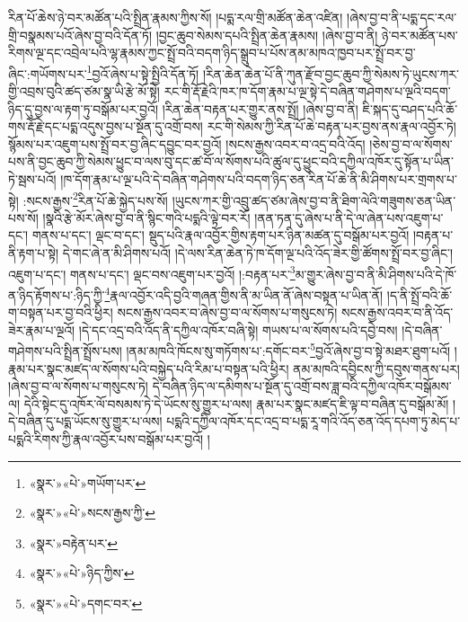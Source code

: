 རིན་པོ་ཆེས་ཉེ་བར་མཚོན་པའི་སྤྲིན་རྣམས་ཀྱིས་སོ། །པདྨ་རལ་གྲི་མཚོན་ཆེན་འཛིན། །ཞེས་བྱ་བ་ནི་པདྨ་དང་རལ་གྲི་བསྣམས་པའོ་ཞེས་བྱ་བའི་དོན་ཏོ། །བྱང་ཆུབ་སེམས་དཔའི་སྤྲིན་ཆེན་རྣམས། །ཞེས་བྱ་བ་ནི། ཉེ་བར་མཚོན་པས་རིགས་ལྔ་དང་འབྲེལ་པའི་ལྷ་རྣམས་ཀྱང་སྤྲོ་བའི་བདག་ཉིད་སྒྲུབ་པ་པོས་ནམ་མཁའ་ཁྱབ་པར་སྤྲོ་བར་བྱ་ཞིང་:གཡོགས་པར་\footnote{«སྣར་»«པེ་»གཡོག་པར་}བྱའོ་ཞེས་པ་སྟེ་སྤྱིའི་དོན་ཏོ། །རིན་ཆེན་ཆེན་པོ་ནི་ཀུན་རྫོབ་བྱང་ཆུབ་ཀྱི་སེམས་ཏེ་ཡུངས་ཀར་གྱི་འབྲས་བུའི་ཚད་ཙམ་སྣ་ཡི་རྩེ་མོ་སྟེ། རང་གི་རྡོ་རྗེའི་ཁར་ཁ་དོག་རྣམ་པ་ལྔ་སྟེ་དེ་བཞིན་གཤེགས་པ་ལྔའི་བདག་ཉིད་དུ་བྱས་ལ་རྟག་ཏུ་བསྒོམ་པར་བྱའོ། །རིན་ཆེན་བརྟན་པར་གྱུར་ནས་སྤྲོ། །ཞེས་བྱ་བ་ནི། ཇི་སྐད་དུ་བཤད་པའི་ཆོ་གས་རྡོ་རྗེ་དང་པདྨ་འདུས་བྱས་པ་སྔོན་དུ་འགྲོ་བས། རང་གི་སེམས་ཀྱི་རིན་པོ་ཆེ་བརྟན་པར་བྱས་ནས་རྣལ་འབྱོར་ཏེ། སྙོམས་པར་འཇུག་པས་སྤྲོ་བར་བྱ་ཞིང་དབྱུང་བར་བྱའོ། །སངས་རྒྱས་འབར་བ་འདྲ་བའི་འོད། །ཅེས་བྱ་བ་ལ་སོགས་པས་ནི་བྱང་ཆུབ་ཀྱི་སེམས་ཕྱུང་བ་ལས་བུ་དང་ཚ་བོ་ལ་སོགས་པའི་ཚུལ་དུ་ཕྱུང་བའི་དཀྱིལ་འཁོར་དུ་སྟོན་པ་ཡིན་ཏེ་སྦས་པའོ། །ཁ་དོག་རྣམ་པ་ལྔ་པའི་དེ་བཞིན་གཤེགས་པའི་བདག་ཉིད་ཅན་རིན་པོ་ཆེ་ནི་མི་ཤིགས་པར་གྲགས་པ་སྟེ། :སངས་རྒྱས་\footnote{«སྣར་»«པེ་»སངས་རྒྱས་ཀྱི་}རིན་པོ་ཆེ་སྐྱེད་པས་སོ། །ཡུངས་ཀར་གྱི་འབྲུ་ཚད་ཙམ་ཞེས་བྱ་བ་ནི་ཐིག་ལེའི་གཟུགས་ཅན་ཡིན་པས་སོ། །སྣའི་རྩེ་མོར་ཞེས་བྱ་བ་ནི་སྙིང་གའི་པདྨའི་ལྟེ་བར་རོ། །ནན་ཏན་དུ་ཞེས་པ་ནི་དེ་ལ་ཞེན་པས་འཇུག་པ་དང་། གནས་པ་དང་། ལྡང་བ་དང་། སྡུད་པའི་རྣལ་འབྱོར་གྱིས་རྟག་པར་ཉིན་མཚན་དུ་བསྒོམ་པར་བྱའོ། །བརྟན་པ་ནི་རྟག་པ་སྟེ། དེ་གང་ཞེ་ན་མི་ཤིགས་པའོ། །དེ་ལས་རིན་ཆེན་ཏེ་ཁ་དོག་ལྔ་པའི་འོད་ཟེར་གྱི་ཚོགས་སྤྲོ་བར་བྱ་ཞིང་། འཇུག་པ་དང་། གནས་པ་དང་། ལྡང་བས་འཇུག་པར་བྱའོ། །:བརྟན་པར་\footnote{«སྣར་»བརྟེན་པར་}མ་གྱུར་ཞེས་བྱ་བ་ནི་མི་ཤིགས་པའི་དེ་ཁོ་ན་ཉིད་རྟོགས་པ་:ཉིད་ཀྱི་\footnote{«སྣར་»«པེ་»ཉིད་ཀྱིས་}རྣལ་འབྱོར་འདི་བྱའི་གཞན་གྱིས་ནི་མ་ཡིན་ནོ་ཞེས་བསྟན་པ་ཡིན་ནོ། །ད་ནི་སྤྲོ་བའི་ཆོ་ག་བསྟན་པར་བྱ་བའི་ཕྱིར། སངས་རྒྱས་འབར་བ་ཞེས་བྱ་བ་ལ་སོགས་པ་གསུངས་ཏེ། སངས་རྒྱས་འབར་བ་ནི་འོད་ཟེར་རྣམ་པ་ལྔའོ། །དེ་དང་འདྲ་བའི་འོད་ནི་དཀྱིལ་འཁོར་བཞི་སྟེ། གཡས་པ་ལ་སོགས་པའི་དབྱེ་བས། །དེ་བཞིན་གཤེགས་པའི་སྤྲིན་སྤྲོས་པས། །ནམ་མཁའི་ཁོངས་སུ་གཏོགས་པ་:དགོང་བར་\footnote{«སྣར་»«པེ་»དགང་བར་}བྱའོ་ཞེས་བྱ་བ་སྟེ་མཐར་ཐུག་པའོ། །རྣམ་པར་སྣང་མཛད་ལ་སོགས་པའི་བསྐྱེད་པའི་རིམ་པ་བསྟན་པའི་ཕྱིར། ནམ་མཁའི་དབྱིངས་ཀྱི་དབུས་གནས་པར། །ཞེས་བྱ་བ་ལ་སོགས་པ་གསུངས་ཏེ། དེ་བཞིན་ཉིད་ལ་དམིགས་པ་སྔོན་དུ་འགྲོ་བས་ཟླ་བའི་དཀྱིལ་འཁོར་བསྒོམས་ལ། དེའི་སྟེང་དུ་འཁོར་ལོ་བསམས་ཏེ་དེ་ཡོངས་སུ་གྱུར་པ་ལས། རྣམ་པར་སྣང་མཛད་ཇི་ལྟ་བ་བཞིན་དུ་བསྒོམ་མོ། །དེ་བཞིན་དུ་པདྨ་ཡོངས་སུ་གྱུར་པ་ལས། པདྨའི་དཀྱིལ་འཁོར་དང་འདྲ་བ་པདྨ་རཱ་གའི་འོད་ཅན་འོད་དཔག་ཏུ་མེད་པ་པདྨའི་རིགས་ཀྱི་རྣལ་འབྱོར་པས་བསྒོམ་པར་བྱའོ། །
